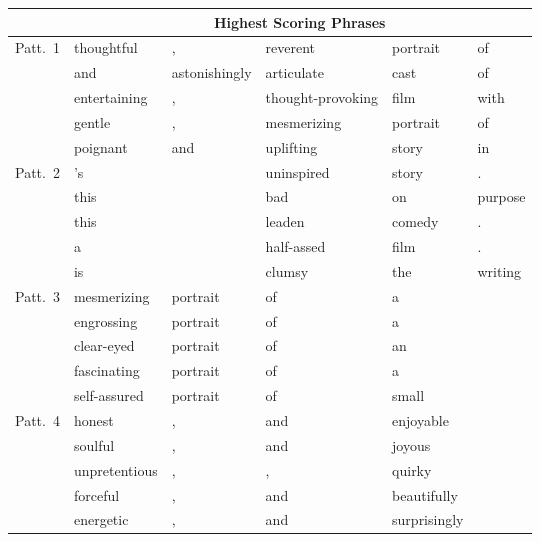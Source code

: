 \documentclass[11pt,a4paper]{article}
\begin{document}
\begin{table}[t]
\small
\newcommand{\ep}{{\color{red}{$\epsilon$}} }
\newcommand{\sloop}[1]{{\color{blue}{#1$_{\textit{SL}}$}} }
\setlength{\tabcolsep}{1.5pt}
\scriptsize
\begin{tabularx}{\linewidth}{c |lllll}
  \toprule
   & \multicolumn{5}{c}{\bf Highest Scoring Phrases} \\
  \midrule
  \multirow{5}{*}{Patt.~1} 
  & thoughtful &     ,        &       reverent  &      portrait  &      of  \\
         & and  &           astonishingly&   articulate&      cast&            of     \\
         &  entertaining&    ,          &     thought-provoking& film&            with       \\ 
         & gentle&        ,   &           mesmerizing&  portrait&  of \\
         & poignant&        and&             uplifting&       story&           in \\

  \midrule

  \multirow{5}{*}{Patt.~2}  
  & 's &           \ep &                uninspired &      story &           .  \\
& this&           \ep&                bad&            on&             purpose \\ 
&this&           \ep&                 leaden&          comedy&          .      \\
& a&              \ep&                 half-assed&      film&            .         \\ 
& is&             \ep&                 clumsy         \sloop{,}&               the&             writing      \\

  \midrule

 \multirow{5}{*}{Patt.~3} 
 & mesmerizing&     portrait    &    of&              a     &         \\ 
& engrossing      &portrait    &    of    &          a     &         \\
 & clear-eyed      &portrait     &   of     &         an&             \\
 & fascinating    & portrait       & of        &      a&              \\ 
 & self-assured     & portrait&        of&              small& \\
  \midrule


\multirow{5}{*}{Patt.~4}  & honest&          ,             & and&            enjoyable& \\
& soulful&        ,         \sloop{scathing} &      and        &    joyous& \\
& unpretentious&  ,          \sloop{charming} &      ,   &           quirky &        \\
& forceful&  ,          &     and&  beautifully&\\
& energetic& ,          &     and&            surprisingly& \\


\end{tabularx}
\end{table}
\end{document}
